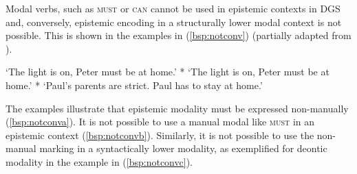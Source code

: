 Modal verbs, such as \textsc{must} or \textsc{can} cannot be used in epistemic contexts in DGS \citep[112]{herrmann2013modal} and, conversely, epistemic encoding in a structurally lower modal context is not possible. This is shown in the examples in (\ref{bsp:notconv}) (partially adapted from \citealt{bross2017scope}). 

\begin{exe}
\ex\label{bsp:notconv}\begin{xlist}
\ex {}  
\glt `The light is on, Peter must be at home.'\label{bsp:notconva}
\ex {} * 
%
\glt `The light is on, Peter must be at home.'\label{bsp:notconvb}
\ex {} * 
%
%
\glt `Paul's parents are strict. Paul has to stay at home.'\label{bsp:notconvc}
\end{xlist}
\end{exe}

\noindent The examples illustrate that epistemic modality must be expressed non-manually (\ref{bsp:notconva}). It is not possible to use a manual modal like \textsc{must} in an epistemic context (\ref{bsp:notconvb}). Similarly, it is not possible to use the non-manual marking in a syntactically lower modality, as exemplified for deontic modality in the example in (\ref{bsp:notconvc}).


